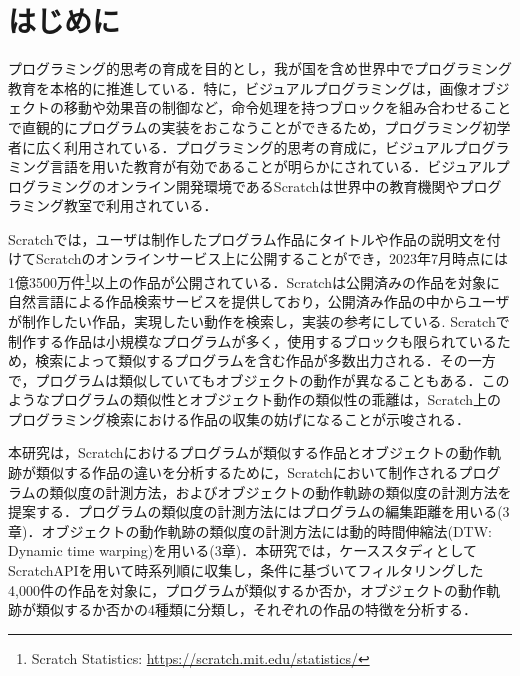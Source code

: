 \documentclass[T,J]{fose} %
\begin{document}
\section{はじめに}
プログラミング的思考の育成を目的とし，我が国を含め世界中でプログラミング教育を本格的に推進している．特に，ビジュアルプログラミングは，画像オブジェクトの移動や効果音の制御など，命令処理を持つブロックを組み合わせることで直観的にプログラムの実装をおこなうことができるため，プログラミング初学者に広く利用されている．プログラミング的思考の育成に，ビジュアルプログラミング言語を用いた教育が有効であることが明らかにされている\cite{Sugiura2008}\cite{Mori2011}\cite{Dasgupta_2016}．ビジュアルプログラミングのオンライン開発環境であるScratchは世界中の教育機関やプログラミング教室で利用されている．

Scratchでは，ユーザは制作したプログラム作品にタイトルや作品の説明文を付けてScratchのオンラインサービス上に公開することができ，2023年7月時点には1億3500万件\footnote{Scratch Statistics: \url{https://scratch.mit.edu/statistics/}}以上の作品が公開されている．Scratchは公開済みの作品を対象に自然言語による作品検索サービスを提供しており，公開済み作品の中からユーザが制作したい作品，実現したい動作を検索し，実装の参考にしている\cite{Resnick_2009}.
Scratchで制作する作品は小規模なプログラムが多く，使用するブロックも限られているため，検索によって類似するプログラムを含む作品が多数出力される．その一方で，プログラムは類似していてもオブジェクトの動作が異なることもある．このようなプログラムの類似性とオブジェクト動作の類似性の乖離は，Scratch上のプログラミング検索における作品の収集の妨げになることが示唆される．

本研究は，Scratchにおけるプログラムが類似する作品とオブジェクトの動作軌跡が類似する作品の違いを分析するために，Scratchにおいて制作されるプログラムの類似度の計測方法，およびオブジェクトの動作軌跡の類似度の計測方法を提案する．プログラムの類似度の計測方法にはプログラムの編集距離を用いる(3章)．オブジェクトの動作軌跡の類似度の計測方法には動的時間伸縮法(DTW: Dynamic time warping)を用いる(3章)．本研究では，ケーススタディとしてScratchAPIを用いて時系列順に収集し，条件に基づいてフィルタリングした4,000件の作品を対象に，プログラムが類似するか否か，オブジェクトの動作軌跡が類似するか否かの4種類に分類し，それぞれの作品の特徴を分析する．
\end{document}
